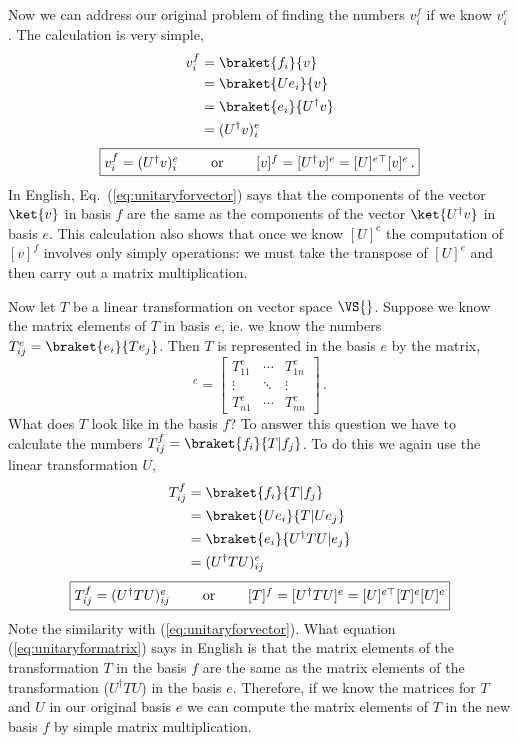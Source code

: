 Now we can address our original problem of finding the numbers $v_i^f$ if we know $v_i^e$.  The calculation is very simple,
\begin{align*}
v^f_i
  &= \braket{f_i}{v}\\
  &= \braket{Ue_i}{v}\\
  &= \braket{e_i}{U^{\dag}v}\\
  &= (U^{\dag}v)^e_i
\end{align*}
\begin{equation}\label{eq:unitaryforvector}
  \framebox{$v^f_i = (U^{\dag}v)^e_i$ \qquad or \qquad $[v]^f = [U^{\dag}v]^e = [U]^{e\top}[v]^e \, .$}
\end{equation}
In English, Eq.~(\ref{eq:unitaryforvector}) says that the components of the vector $\ket{v}$ in basis $f$ are the same as the components of the vector $\ket{U^{\dag}v}$ in basis $e$.
This calculation also shows that once we know $[U]^e$ the computation of $[v]^f$ involves only simply operations: we must take the transpose of $[U]^e$ and then carry out a matrix multiplication.

Now let $T$ be a linear transformation on vector space $\VS{}$.
Suppose we know the matrix elements of $T$ in basis $e$, ie. we know the numbers $T^{e}_{ij} = \braket{e_i}{Te_j}$.
Then $T$ is represented in the basis $e$ by the matrix,
\begin{displaymath}
  [T]^e = \left[ \begin{array}{ccc} T^e_{11} & \cdots & T^e_{1n}\\ \vdots & \ddots & \vdots \\ T^e_{n1}&\cdots & T^e_{nn} \end{array} \right]
  \, .
\end{displaymath}
What does $T$ look like in the basis $f$?
To answer this question we have to calculate the numbers $T^f_{ij} = \braket{f_i}{T|f_j}$.
To do this we again use the linear transformation $U$,
\begin{align*}
T^f_{ij}
  &= \braket{f_i}{T|f_j}\\
  &= \braket{Ue_i}{T|Ue_j}\\
  &= \braket{e_i}{U^{\dag}TU|e_j}\\
  &= (U^{\dag}TU)^e_{ij}
\end{align*}
\begin{equation}\label{eq:unitaryformatrix}
\framebox{$T^{f}_{ij} = (U^{\dag}TU)^{e}_{ij}$ \qquad or \qquad $[T]^f = [U^{\dag}TU]^e = [U]^{e\top}[T]^e[U]^e$}
\end{equation}
Note the similarity with (\ref{eq:unitaryforvector}).
What equation (\ref{eq:unitaryformatrix}) says in English is that the matrix elements of the transformation $T$ in the basis $f$ are the same as the matrix elements of the transformation ($U^{\dag}TU$) in the basis $e$.
Therefore, if we know the matrices for $T$ and $U$ in our original basis $e$ we can compute the matrix elements of $T$ in the new basis $f$ by simple matrix multiplication.

